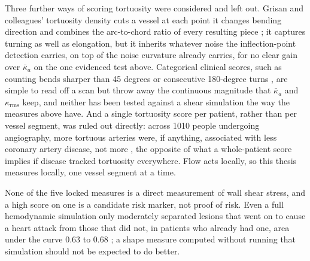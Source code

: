 Three further ways of scoring tortuosity were considered and left out. Grisan and colleagues'
tortuosity density cuts a vessel at each point it changes bending direction and combines the
arc-to-chord ratio of every resulting piece \cite{grisan2008tortuosity}; it captures turning as well
as elongation, but it inherits whatever noise the inflection-point detection carries, on top of the
noise curvature already carries, for no clear gain over $\bar\kappa_a$ on the one evidenced test
above. Categorical clinical scores, such as counting bends sharper than 45 degrees or consecutive
180-degree turns \cite{groves2009tortuosity}, are simple to read off a scan but throw away the
continuous magnitude that $\bar\kappa_a$ and $\kappa_{\mathrm{rms}}$ keep, and neither has been
tested against a shear simulation the way the measures above have. And a single tortuosity score per
patient, rather than per vessel segment, was ruled out directly: across 1010 people undergoing
angiography, more tortuous arteries were, if anything, associated with less coronary artery disease,
not more \cite{li2011tortuosity}, the opposite of what a whole-patient score implies if disease
tracked tortuosity everywhere. Flow acts locally, so this thesis measures locally, one vessel
segment at a time.

None of the five locked measures is a direct measurement of wall shear stress, and a high score on
one is a candidate risk marker, not proof of risk. Even a full hemodynamic simulation only
moderately separated lesions that went on to cause a heart attack from those that did not, in
patients who already had one, area under the curve 0.63 to 0.68 \cite{griffo2026wss}; a shape
measure computed without running that simulation should not be expected to do better.
